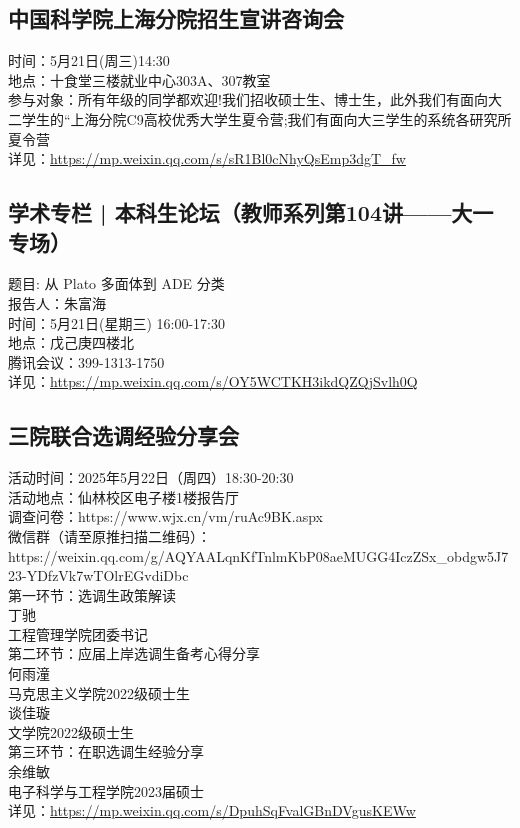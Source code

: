\documentclass[letterpaper, 12pt]{article}
\begin{document}
\begin{multicols}{2}
\subsection{中国科学院上海分院招生宣讲咨询会} %
时间：5月21日(周三)14:30
\\地点：十食堂三楼就业中心303A、307教室
\\参与对象：所有年级的同学都欢迎!我们招收硕士生、博士生，此外我们有面向大二学生的“上海分院C9高校优秀大学生夏令营;我们有面向大三学生的系统各研究所夏令营
\\详见：\url{https://mp.weixin.qq.com/s/sR1Bl0cNhyQsEmp3dgT_fw}

\subsection{学术专栏 | 本科生论坛（教师系列第104讲——大一专场）} %
题目: 从 Plato 多面体到 ADE 分类
\\报告人：朱富海
\\时间：5月21日(星期三) 16:00-17:30
\\地点：戊己庚四楼北
\\腾讯会议：399-1313-1750
\\详见：\url{https://mp.weixin.qq.com/s/OY5WCTKH3ikdQZQjSvlh0Q}
\subsection{三院联合选调经验分享会} %
活动时间：2025年5月22日（周四）18:30-20:30
\\活动地点：仙林校区电子楼1楼报告厅
\\调查问卷：https://www.wjx.cn/vm/ruAc9BK.aspx
\\微信群（请至原推扫描二维码）：https://weixin.qq.com/g/AQYAALqnKfTnlmKbP08aeMUGG4IczZSx\_obdgw5J723-YDfzVk7wTOlrEGvdiDbc
\\第一环节：选调生政策解读
\\丁驰
\\工程管理学院团委书记
\\第二环节：应届上岸选调生备考心得分享
\\何雨潼
\\马克思主义学院2022级硕士生
\\谈佳璇
\\文学院2022级硕士生
\\第三环节：在职选调生经验分享
\\余维敏
\\电子科学与工程学院2023届硕士
\\详见：\url{https://mp.weixin.qq.com/s/DpuhSqFvalGBnDVgusKEWw}


\end{multicols}
\end{document}
